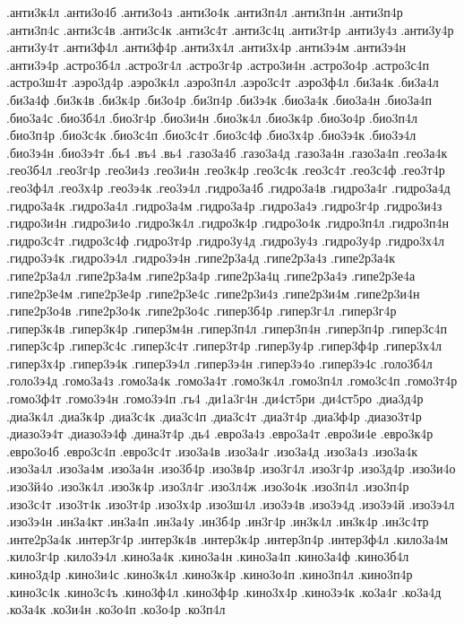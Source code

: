 {.анти3к4л
.анти3о4б
.анти3о4з
.анти3о4к
.анти3п4л
.анти3п4н
.анти3п4р
.анти3п4с
.анти3с4в
.анти3с4к
.анти3с4т
.анти3с4ц
.анти3т4р
.анти3у4з
.анти3у4р
.анти3у4т
.анти3ф4л
.анти3ф4р
.анти3х4л
.анти3х4р
.анти3э4м
.анти3э4н
.анти3э4р
.астро3б4л
.астро3г4л
.астро3г4р
.астро3и4н
.астро3о4р
.астро3с4п
.астро3ш4т
.аэро3д4р
.аэро3к4л
.аэро3п4л
.аэро3с4т
.аэро3ф4л
.би3а4к
.би3а4л
.би3а4ф
.би3к4в
.би3к4р
.би3о4р
.би3п4р
.би3э4к
.био3а4к
.био3а4н
.био3а4п
.био3а4с
.био3б4л
.био3г4р
.био3и4н
.био3к4л
.био3к4р
.био3о4р
.био3п4л
.био3п4р
.био3с4к
.био3с4п
.био3с4т
.био3с4ф
.био3х4р
.био3э4к
.био3э4л
.био3э4н
.био3э4т
.бь4
.въ4
.вь4
.газо3а4б
.газо3а4д
.газо3а4н
.газо3а4п
.гео3а4к
.гео3б4л
.гео3г4р
.гео3и4з
.гео3и4н
.гео3к4р
.гео3с4к
.гео3с4т
.гео3с4ф
.гео3т4р
.гео3ф4л
.гео3х4р
.гео3э4к
.гео3э4л
.гидро3а4б
.гидро3а4в
.гидро3а4г
.гидро3а4д
.гидро3а4к
.гидро3а4л
.гидро3а4м
.гидро3а4р
.гидро3а4э
.гидро3г4р
.гидро3и4з
.гидро3и4н
.гидро3и4о
.гидро3к4л
.гидро3к4р
.гидро3о4к
.гидро3п4л
.гидро3п4н
.гидро3с4т
.гидро3с4ф
.гидро3т4р
.гидро3у4д
.гидро3у4з
.гидро3у4р
.гидро3х4л
.гидро3э4к
.гидро3э4л
.гидро3э4н
.гипе2р3а4д
.гипе2р3а4з
.гипе2р3а4к
.гипе2р3а4л
.гипе2р3а4м
.гипе2р3а4р
.гипе2р3а4ц
.гипе2р3а4э
.гипе2р3е4а
.гипе2р3е4м
.гипе2р3е4р
.гипе2р3е4с
.гипе2р3и4з
.гипе2р3и4м
.гипе2р3и4н
.гипе2р3о4в
.гипе2р3о4к
.гипе2р3о4с
.гипер3б4р
.гипер3г4л
.гипер3г4р
.гипер3к4в
.гипер3к4р
.гипер3м4н
.гипер3п4л
.гипер3п4н
.гипер3п4р
.гипер3с4п
.гипер3с4р
.гипер3с4с
.гипер3с4т
.гипер3т4р
.гипер3у4р
.гипер3ф4р
.гипер3х4л
.гипер3х4р
.гипер3э4к
.гипер3э4л
.гипер3э4н
.гипер3э4о
.гипер3э4с
.голо3б4л
.голо3э4д
.гомо3а4з
.гомо3а4к
.гомо3а4т
.гомо3к4л
.гомо3п4л
.гомо3с4п
.гомо3т4р
.гомо3ф4т
.гомо3э4н
.гомо3э4п
.гь4
.ди1а3г4н
.ди4ст5ри
.ди4ст5ро
.диа3д4р
.диа3к4л
.диа3к4р
.диа3с4к
.диа3с4п
.диа3с4т
.диа3т4р
.диа3ф4р
.диазо3т4р
.диазо3э4т
.диазо3э4ф
.дина3т4р
.дь4
.евро3а4з
.евро3а4т
.евро3и4е
.евро3к4р
.евро3о4б
.евро3с4п
.евро3с4т
.изо3а4в
.изо3а4г
.изо3а4д
.изо3а4з
.изо3а4к
.изо3а4л
.изо3а4м
.изо3а4н
.изо3б4р
.изо3в4р
.изо3г4л
.изо3г4р
.изо3д4р
.изо3и4о
.изо3й4о
.изо3к4л
.изо3к4р
.изо3л4г
.изо3л4ж
.изо3о4к
.изо3п4л
.изо3п4р
.изо3с4т
.изо3т4к
.изо3т4р
.изо3х4р
.изо3ш4л
.изо3э4в
.изо3э4д
.изо3э4й
.изо3э4л
.изо3э4н
.ин3а4кт
.ин3а4п
.ин3а4у
.ин3б4р
.ин3г4р
.ин3к4л
.ин3к4р
.ин3с4тр
.инте2р3а4к
.интер3г4р
.интер3к4в
.интер3к4р
.интер3п4р
.интер3ф4л
.кило3а4м
.кило3г4р
.кило3э4л
.кино3а4к
.кино3а4н
.кино3а4п
.кино3а4ф
.кино3б4л
.кино3д4р
.кино3и4с
.кино3к4л
.кино3к4р
.кино3о4п
.кино3п4л
.кино3п4р
.кино3с4к
.кино3с4ъ
.кино3ф4л
.кино3ф4р
.кино3х4р
.кино3э4к
.ко3а4г
.ко3а4д
.ко3а4к
.ко3и4н
.ко3о4п
.ко3о4р
.ко3п4л
}
